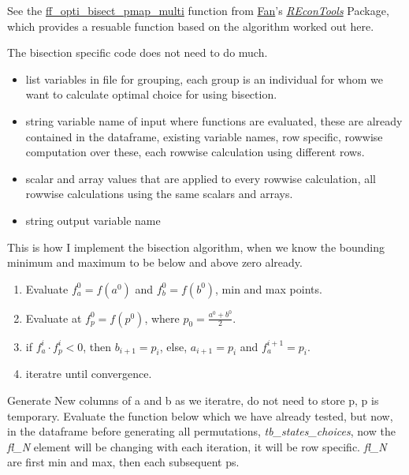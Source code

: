 \documentclass[
]{book}
\providecommand{\tightlist}{%
  \setlength{\itemsep}{0pt}\setlength{\parskip}{0pt}}
\begin{document}
See the \href{https://fanwangecon.github.io/REconTools/reference/ff_opti_bisect_pmap_multi.html}{ff\_opti\_bisect\_pmap\_multi} function from \href{https://fanwangecon.github.io/}{Fan}'s \emph{\href{https://fanwangecon.github.io/REconTools/}{REconTools}} Package, which provides a resuable function based on the algorithm worked out here.

The bisection specific code does not need to do much.

\begin{itemize}
\tightlist
\item
  list variables in file for grouping, each group is an individual for whom we want to calculate optimal choice for using bisection.
\item
  string variable name of input where functions are evaluated, these are already contained in the dataframe, existing variable names, row specific, rowwise computation over these, each rowwise calculation using different rows.
\item
  scalar and array values that are applied to every rowwise calculation, all rowwise calculations using the same scalars and arrays.
\item
  string output variable name
\end{itemize}

This is how I implement the bisection algorithm, when we know the bounding minimum and maximum to be below and above zero already.

\begin{enumerate}
\def\labelenumi{\arabic{enumi}.}
\tightlist
\item
  Evaluate \(f^0_a = f(a^0)\) and \(f^0_b = f(b^0)\), min and max points.
\item
  Evaluate at \(f^0_p = f(p^0)\), where \(p_0 = \frac{a^0+b^0}{2}\).
\item
  if \(f^i_a \cdot f^i_p < 0\), then \(b_{i+1} = p_i\), else, \(a_{i+1} = p_i\) and \(f^{i+1}_a = p_i\).
\item
  iteratre until convergence.
\end{enumerate}

Generate New columns of a and b as we iteratre, do not need to store p, p is temporary. Evaluate the function below which we have already tested, but now, in the dataframe before generating all permutations, \emph{tb\_states\_choices}, now the \emph{fl\_N} element will be changing with each iteration, it will be row specific. \emph{fl\_N} are first min and max, then each subsequent ps.
\end{document}
